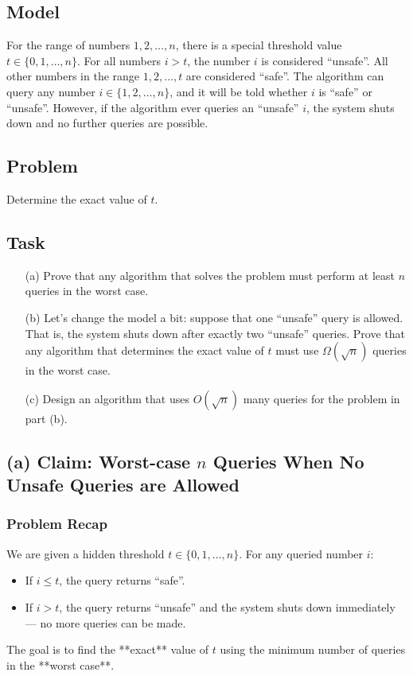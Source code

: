 \documentclass[12pt]{article}
\begin{document}
	\subsection*{Model}
	For the range of numbers \( 1, 2, \ldots, n \), there is a special threshold value \( t \in \{0, 1, \ldots, n\} \). For all numbers \( i > t \), the number \( i \) is considered ``unsafe''. All other numbers in the range \( 1, 2, \ldots, t \) are considered ``safe''. The algorithm can query any number \( i \in \{1, 2, \ldots, n\} \), and it will be told whether \( i \) is ``safe'' or ``unsafe''. However, if the algorithm ever queries an ``unsafe'' \( i \), the system shuts down and no further queries are possible.
	
	\subsection*{Problem}
	Determine the exact value of \( t \).
	
	\subsection*{Task}
	\begin{enumerate}
		\item[(a)] Prove that any algorithm that solves the problem must perform at least \( n \) queries in the worst case.
		\item[(b)] Let's change the model a bit: suppose that one ``unsafe'' query is allowed. That is, the system shuts down after exactly two ``unsafe'' queries. Prove that any algorithm that determines the exact value of \( t \) must use \( \Omega(\sqrt{n}) \) queries in the worst case.
		\item[(c)] Design an algorithm that uses \( O(\sqrt{n}) \) many queries for the problem in part (b).
	\end{enumerate}
	
	\subsection*{(a) Claim: Worst-case $n$ Queries When No Unsafe Queries are Allowed}
	
	\subsubsection*{Problem Recap}
	We are given a hidden threshold $t \in \{0, 1, \ldots, n\}$. For any queried number $i$:
	\begin{itemize}
		\item If $i \le t$, the query returns ``safe''.
		\item If $i > t$, the query returns ``unsafe'' and the system shuts down immediately — no more queries can be made.
	\end{itemize}
	The goal is to find the **exact** value of $t$ using the minimum number of queries in the **worst case**.
	
\end{document}

